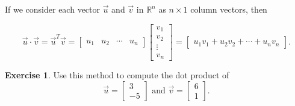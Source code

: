 \documentclass{beamer}
\newcommand{\R}{\mathbb{R}}
\newcommand{\fn}{\insertframenumber}
\theoremstyle{definition}
\newtheorem{exercise}{Exercise}
\begin{document}
\begin{frame}{\fn}
	If we consider each vector $\vec u$ and $\vec v$ in $\R^n$ as $n\times 1$ column vectors, then
	
		\[\vec u\cdot\vec v=\vec u^T\vec v=\begin{bmatrix}u_1&u_2&\cdots&u_n\end{bmatrix}\begin{bmatrix}v_1\\v_2\\\vdots\\v_n\end{bmatrix}=\begin{bmatrix}u_1v_1+u_2v_2+\cdots+u_nv_n\end{bmatrix}.\]
	\begin{exercise}
		Use this method to compute the dot product of \[\vec u=\begin{bmatrix}3\\-5\end{bmatrix}\text{ and }\vec v=\begin{bmatrix}6\\1\end{bmatrix}.\]
	\end{exercise}
\end{frame}
\end{document}
